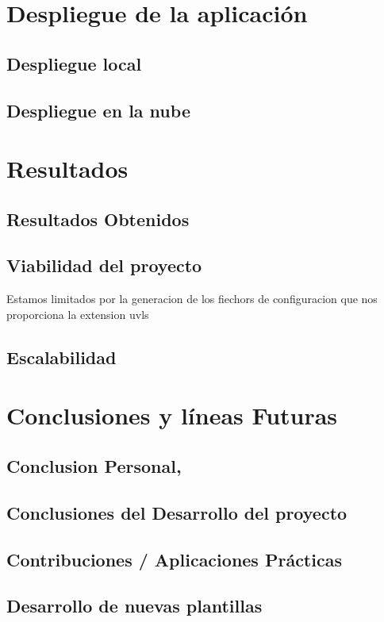 \documentclass[12pt, a4paper, twoside]{article}
\begin{document}
\section{Despliegue de la aplicación  }
\subsection{ Despliegue local }
\subsection{ Despliegue en la nube }


\section{Resultados}
\subsection{Resultados Obtenidos}
\subsection{Viabilidad del proyecto}
Estamos limitados por la generacion de los fiechors de configuracion que nos proporciona la extension uvls
\subsection{Escalabilidad}

\section{Conclusiones y líneas Futuras }
\subsection{Conclusion Personal,}
\subsection{Conclusiones del Desarrollo del proyecto}
\subsection{Contribuciones / Aplicaciones Prácticas}
\subsection{Desarrollo de nuevas plantillas }
\end{document}

